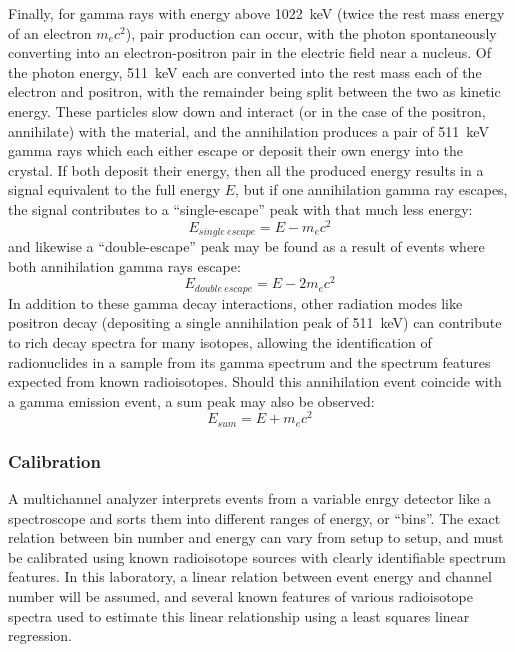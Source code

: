 \documentclass[12pt]{article}
\begin{document}
Finally, for gamma rays with energy above 1022~keV (twice the rest mass energy of an electron $m_ec^2$), pair production can occur, with the photon spontaneously converting into an electron-positron pair in the electric field near a nucleus.
Of the photon energy, 511~keV each are converted into the rest mass each of the electron and positron, with the remainder being split between the two as kinetic energy.
These particles slow down and interact (or in the case of the positron, annihilate) with the material, and the annihilation produces a pair of 511~keV gamma rays which each either escape or deposit their own energy into the crystal.
If both deposit their energy, then all the produced energy results in a signal equivalent to the full energy $E$, but if one annihilation gamma ray escapes, the signal contributes to a ``single-escape'' peak with that much less energy\cite{npre_lab_6_manual_2025}:
\begin{equation}
    \label{eq:sing-esc}
    E_{single~escape} = E - m_ec^2
\end{equation}
and likewise a ``double-escape'' peak may be found as a result of events where both annihilation gamma rays escape\cite{npre_lab_6_manual_2025}:
\begin{equation}
    \label{eq:doub-esc}
    E_{double~escape} = E - 2m_ec^2
\end{equation}
In addition to these gamma decay interactions, other radiation modes like positron decay (depositing a single annihilation peak of 511~keV\cite{noauthor_sodium_nodate}) can contribute to rich decay spectra for many isotopes, allowing the identification of radionuclides in a sample from its gamma spectrum and the spectrum features expected from known radioisotopes.
Should this annihilation event coincide with a gamma emission event, a sum peak may also be observed:
\begin{equation}
    \label{eq:sum}
    E_{sum} = E + m_ec^2
\end{equation}
\subsubsection{Calibration}
A multichannel analyzer interprets events from a variable enrgy detector like a spectroscope and sorts them into different ranges of energy, or ``bins''. The exact relation between bin number and energy can vary from setup to setup, and must be calibrated using known radioisotope sources with clearly identifiable spectrum features.
In this laboratory, a linear relation between event energy and channel number will be assumed, and several known features of various radioisotope spectra used to estimate this linear relationship using a least squares linear regression.
\end{document}
